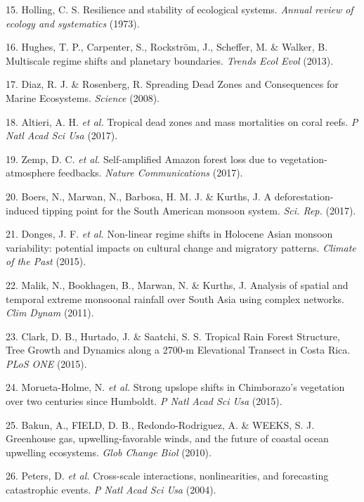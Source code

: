 \documentclass[9pt,]{article}
\begin{document}
\hypertarget{ref-Holling:1973p6861}{}
15. Holling, C. S. Resilience and stability of ecological systems.
\emph{Annual review of ecology and systematics} (1973).

\hypertarget{ref-Hughes:2013cv}{}
16. Hughes, T. P., Carpenter, S., Rockström, J., Scheffer, M. \& Walker,
B. Multiscale regime shifts and planetary boundaries. \emph{Trends Ecol
Evol} (2013).

\hypertarget{ref-Diaz:2008p199}{}
17. Diaz, R. J. \& Rosenberg, R. Spreading Dead Zones and Consequences
for Marine Ecosystems. \emph{Science} (2008).

\hypertarget{ref-Altieri:2017bl}{}
18. Altieri, A. H. \emph{et al.} Tropical dead zones and mass
mortalities on coral reefs. \emph{P Natl Acad Sci Usa} (2017).

\hypertarget{ref-Zemp:2017dr}{}
19. Zemp, D. C. \emph{et al.} Self-amplified Amazon forest loss due to
vegetation-atmosphere feedbacks. \emph{Nature Communications} (2017).

\hypertarget{ref-Boers:2017ej}{}
20. Boers, N., Marwan, N., Barbosa, H. M. J. \& Kurths, J. A
deforestation-induced tipping point for the South American monsoon
system. \emph{Sci. Rep.} (2017).

\hypertarget{ref-Donges:2015fv}{}
21. Donges, J. F. \emph{et al.} Non-linear regime shifts in Holocene
Asian monsoon variability: potential impacts on cultural change and
migratory patterns. \emph{Climate of the Past} (2015).

\hypertarget{ref-Malik:2011bv}{}
22. Malik, N., Bookhagen, B., Marwan, N. \& Kurths, J. Analysis of
spatial and temporal extreme monsoonal rainfall over South Asia using
complex networks. \emph{Clim Dynam} (2011).

\hypertarget{ref-Clark:2015bj}{}
23. Clark, D. B., Hurtado, J. \& Saatchi, S. S. Tropical Rain Forest
Structure, Tree Growth and Dynamics along a 2700-m Elevational Transect
in Costa Rica. \emph{PLoS ONE} (2015).

\hypertarget{ref-MoruetaHolme:2015fy}{}
24. Morueta-Holme, N. \emph{et al.} Strong upslope shifts in
Chimborazo's vegetation over two centuries since Humboldt. \emph{P Natl
Acad Sci Usa} (2015).

\hypertarget{ref-Bakun:2010p5340}{}
25. Bakun, A., FIELD, D. B., Redondo-Rodriguez, A. \& WEEKS, S. J.
Greenhouse gas, upwelling-favorable winds, and the future of coastal
ocean upwelling ecosystems. \emph{Glob Change Biol} (2010).

\hypertarget{ref-DebraPCPeters:2004ex}{}
26. Peters, D. \emph{et al.} Cross-scale interactions, nonlinearities,
and forecasting catastrophic events. \emph{P Natl Acad Sci Usa} (2004).
\end{document}
